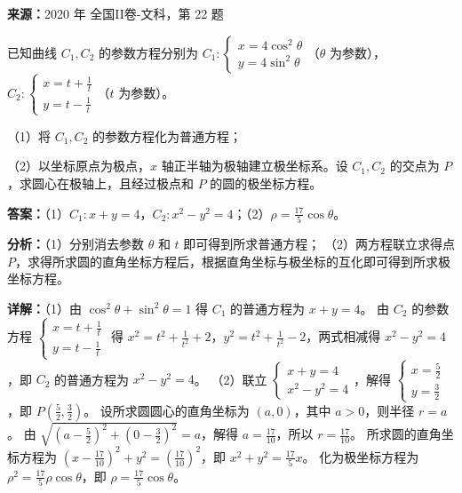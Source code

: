 \begin{question}[points=10]
\textbf{来源：}2020 年 全国II卷-文科，第 22 题\par
[选修4—4：坐标系与参数方程]

已知曲线 $C_1, C_2$ 的参数方程分别为 $C_1:\begin{cases} x=4\cos^2\theta \\ y=4\sin^2\theta \end{cases}$（$\theta$ 为参数），$C_2:\begin{cases} x=t+\frac{1}{t} \\ y=t-\frac{1}{t} \end{cases}$（$t$ 为参数）。

（1）将 $C_1, C_2$ 的参数方程化为普通方程；

（2）以坐标原点为极点，$x$ 轴正半轴为极轴建立极坐标系。设 $C_1, C_2$ 的交点为 $P$，求圆心在极轴上，且经过极点和 $P$ 的圆的极坐标方程。
\begin{solution}
\textbf{答案：}（1）$C_1: x+y=4$，$C_2: x^2-y^2=4$；（2）$\rho=\frac{17}{5}\cos\theta$。

\textbf{分析：}（1）分别消去参数 $\theta$ 和 $t$ 即可得到所求普通方程；
（2）两方程联立求得点 $P$，求得所求圆的直角坐标方程后，根据直角坐标与极坐标的互化即可得到所求极坐标方程。

\textbf{详解：}（1）由 $\cos^2\theta+\sin^2\theta=1$ 得 $C_1$ 的普通方程为 $x+y=4$。
由 $C_2$ 的参数方程 $\begin{cases} x=t+\frac{1}{t} \\ y=t-\frac{1}{t} \end{cases}$ 得 $x^2=t^2+\frac{1}{t^2}+2$，$y^2=t^2+\frac{1}{t^2}-2$，两式相减得 $x^2-y^2=4$，即 $C_2$ 的普通方程为 $x^2-y^2=4$。
（2）联立 $\begin{cases} x+y=4 \\ x^2-y^2=4 \end{cases}$，解得 $\begin{cases} x=\frac{5}{2} \\ y=\frac{3}{2} \end{cases}$，即 $P\left(\frac{5}{2},\frac{3}{2}\right)$。
设所求圆圆心的直角坐标为 $(a,0)$，其中 $a>0$，则半径 $r=a$。
由 $\sqrt{\left(a-\frac{5}{2}\right)^2+\left(0-\frac{3}{2}\right)^2}=a$，解得 $a=\frac{17}{10}$，所以 $r=\frac{17}{10}$。
所求圆的直角坐标方程为 $\left(x-\frac{17}{10}\right)^2+y^2=\left(\frac{17}{10}\right)^2$，即 $x^2+y^2=\frac{17}{5}x$。
化为极坐标方程为 $\rho^2=\frac{17}{5}\rho\cos\theta$，即 $\rho=\frac{17}{5}\cos\theta$。
\end{solution}
\end{question}

